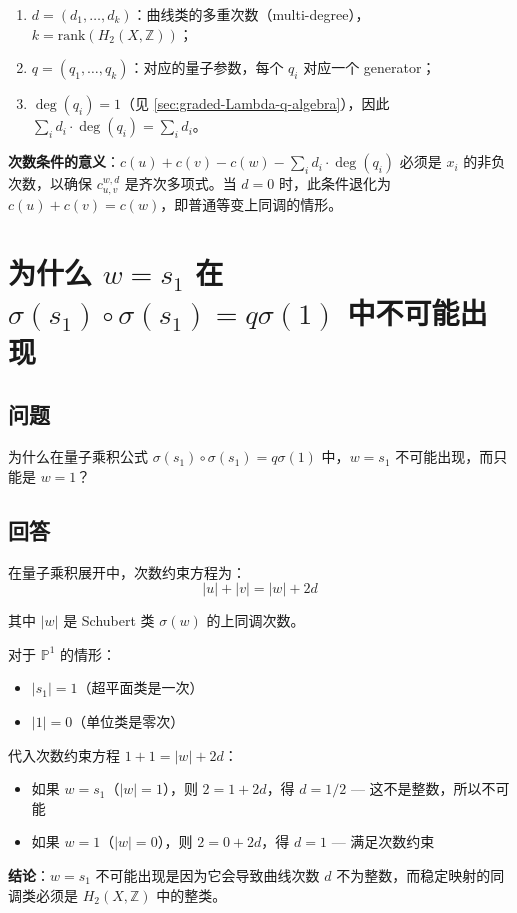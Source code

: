 \begin{enumerate}
\item \textbf{$d = (d_1, \ldots, d_k)$}：曲线类的多重次数（multi-degree），$k = \text{rank}(H_2(X,\mathbb{Z}))$；
\item \textbf{$q = (q_1, \ldots, q_k)$}：对应的量子参数，每个 $q_i$ 对应一个 generator；
\item \textbf{$\deg(q_i) = 1$}（见 \cref{sec:graded-Lambda-q-algebra}），因此 $\sum_i d_i \cdot \deg(q_i) = \sum_i d_i$。
\end{enumerate}

\textbf{次数条件的意义}：$c(u) + c(v) - c(w) - \sum_i d_i \cdot \deg(q_i)$ 必须是 $x_i$ 的非负次数，以确保 $c_{u,v}^{w,d}$ 是齐次多项式。当 $d = 0$ 时，此条件退化为 $c(u) + c(v) = c(w)$，即普通等变上同调的情形。

\section{为什么 $w = s_1$ 在 $\sigma(s_1) \circ \sigma(s_1) = q \sigma(1)$ 中不可能出现}\label{sec:qa-w-s1-degree-mismatch}
\subsection{问题}
为什么在量子乘积公式 $\sigma(s_1) \circ \sigma(s_1) = q \sigma(1)$ 中，$w = s_1$ 不可能出现，而只能是 $w = 1$？
\subsection{回答}
在量子乘积展开中，次数约束方程为：
$$|u| + |v| = |w| + 2d$$

其中 $|w|$ 是 Schubert 类 $\sigma(w)$ 的上同调次数。

对于 $\mathbb{P}^1$ 的情形：
\begin{itemize}
\item $|s_1| = 1$（超平面类是一次）
\item $|1| = 0$（单位类是零次）
\end{itemize}

代入次数约束方程 $1 + 1 = |w| + 2d$：
\begin{itemize}
\item 如果 $w = s_1$（$|w| = 1$），则 $2 = 1 + 2d$，得 $d = 1/2$ — 这不是整数，所以不可能
\item 如果 $w = 1$（$|w| = 0$），则 $2 = 0 + 2d$，得 $d = 1$ — 满足次数约束
\end{itemize}

\textbf{结论}：$w = s_1$ 不可能出现是因为它会导致曲线次数 $d$ 不为整数，而稳定映射的同调类必须是 $H_2(X, \mathbb{Z})$ 中的整类。

